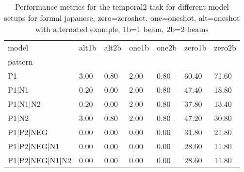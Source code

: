 \begin{table}[h]
\begin{tabular}{l|llllll}
\toprule
model & alt1b & alt2b & one1b & one2b & zero1b & zero2b \\
pattern &  &  &  &  &  &  \\
\midrule
P1 & 3.00 & 0.80 & 2.00 & 0.80 & 60.40 & 71.60 \\
P1|N1 & 0.20 & 0.00 & 2.00 & 0.80 & 47.40 & 18.80 \\
P1|N1|N2 & 0.20 & 0.00 & 2.00 & 0.80 & 37.80 & 13.40 \\
P1|N2 & 3.00 & 0.80 & 2.00 & 0.80 & 47.20 & 30.80 \\
P1|P2|NEG & 0.00 & 0.00 & 0.00 & 0.00 & 31.80 & 21.80 \\
P1|P2|NEG|N1 & 0.00 & 0.00 & 0.00 & 0.00 & 28.60 & 11.80 \\
P1|P2|NEG|N1|N2 & 0.00 & 0.00 & 0.00 & 0.00 & 28.60 & 11.80 \\
\bottomrule
\end{tabular}
\caption{Performance metrics for the temporal2 task for different model setups for formal japanese, zero=zeroshot, one=oneshot, alt=oneshot with alternated example, 1b=1 beam, 2b=2 beams}
\label{tab:ja form_temporal2_performance}
\end{table}
